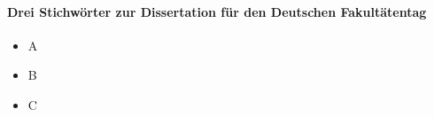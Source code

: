 \clearpage
\thispagestyle{plain}
\paragraph*{Drei Stichwörter zur Dissertation für den Deutschen Fakultätentag}
\begin{itemize}
    \item A
    \item B
    \item C
\end{itemize}
